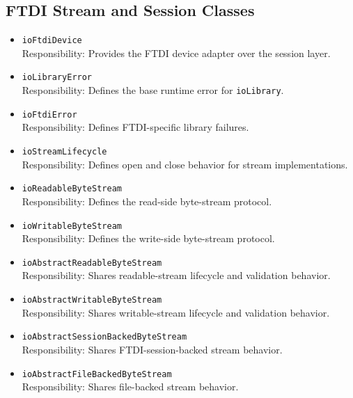 \subsection{FTDI Stream and Session Classes}
\begin{itemize}
    \item \texttt{ioFtdiDevice} \\
    Responsibility: Provides the FTDI device adapter over the session layer.

    \item \texttt{ioLibraryError} \\
    Responsibility: Defines the base runtime error for \texttt{ioLibrary}.

    \item \texttt{ioFtdiError} \\
    Responsibility: Defines FTDI-specific library failures.

    \item \texttt{ioStreamLifecycle} \\
    Responsibility: Defines open and close behavior for stream implementations.

    \item \texttt{ioReadableByteStream} \\
    Responsibility: Defines the read-side byte-stream protocol.

    \item \texttt{ioWritableByteStream} \\
    Responsibility: Defines the write-side byte-stream protocol.

    \item \texttt{ioAbstractReadableByteStream} \\
    Responsibility: Shares readable-stream lifecycle and validation behavior.

    \item \texttt{ioAbstractWritableByteStream} \\
    Responsibility: Shares writable-stream lifecycle and validation behavior.

    \item \texttt{ioAbstractSessionBackedByteStream} \\
    Responsibility: Shares FTDI-session-backed stream behavior.

    \item \texttt{ioAbstractFileBackedByteStream} \\
    Responsibility: Shares file-backed stream behavior.


\end{itemize}
